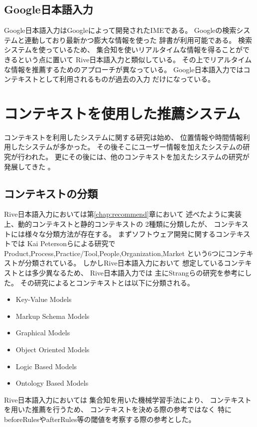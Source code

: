 \subsection{Google日本語入力}
Google日本語入力はGoogleによって開発されたIMEである。
Googleの検索システムと連動しており最新かつ膨大な情報を使った
辞書が利用可能である。
検索システムを使っているため、
集合知を使いリアルタイムな情報を得ることができるという点に置いて
Rive日本語入力と類似している。
その上でリアルタイムな情報を推薦するためのアプローチが異なっている。
Google日本語入力ではコンテキストとして利用されるものが過去の入力
だけになっている。


\section{コンテキストを使用した推薦システム}
コンテキストを利用したシステムに関する研究は始め、
位置情報や時間情報利用したシステムが多かった。
その後そこにユーザー情報を加えたシステムの研究が行われた。
更にその後には、他のコンテキストを加えたシステムの研究が発展してきた
\cite{okukenta}。

\subsection{コンテキストの分類}
Rive日本語入力においては第\ref{chap:recommend}章において
述べたように実装上、動的コンテキストと静的コンテキストの
2種類に分類したが、
コンテキストには様々な分類方法が存在する。
まずソフトウェア開発に関するコンテキストでは
Kai Petersonらによる研究で\cite{KAIPETERSON}
Product,Process,Practice/Tool,People,Organization,Market
という6つにコンテキストが分類されている。
しかしRive日本語入力において
想定しているコンテキストとは多少異なるため、
Rive日本語入力では
主にStrangらの研究\cite{contextsurvey}を参考にした。
その研究によるとコンテキストとは以下に分類される。
\begin{itemize}
  \item Key-Value Models
  \item Markup Schema Models
  \item Graphical Models
  \item Object Oriented Models
  \item Logic Based Models
  \item Ontology Based Models
\end{itemize}
Rive日本語入力においては
集合知を用いた機械学習手法により、
コンテキストを用いた推薦を行うため、
コンテキストを決める際の参考ではなく
特にbeforeRulesやafterRules等の閾値を考察する際の参考とした。

